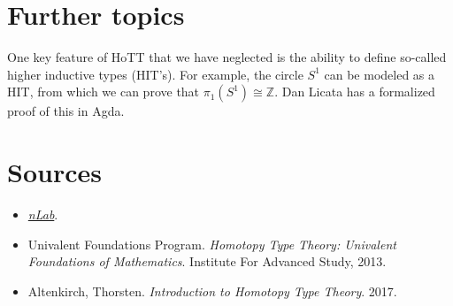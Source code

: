 \documentclass[10pt,letterpaper,cm]{nupset}
\theoremstyle{definition}
\theoremstyle{theorem}
\theoremstyle{remark}
\newcommand{\Z}{\mathbb Z}
\newcommand{\1}{\mathbf{1}}
\newcommand{\0}{\vec 0}
\begin{document}
\section*{Further topics}

One key feature of HoTT that we have neglected is the ability to define so-called higher inductive types (HIT's). For example, the circle $S^1$ can be modeled as a HIT, from which we can prove that $\pi_1(S^1) \cong \Z$. Dan Licata has a formalized proof of this in Agda.

\section*{Sources}

\begin{itemize}
\item \href{https://ncatlab.org/nlab/show/HomePage}{\textit{nLab}}.
\item Univalent Foundations Program. \textit{Homotopy Type Theory: Univalent Foundations of Mathematics}. Institute For Advanced Study, 2013.
\item Altenkirch, Thorsten. \textit{Introduction to Homotopy Type Theory}. 2017.
\end{itemize}
\end{document}
